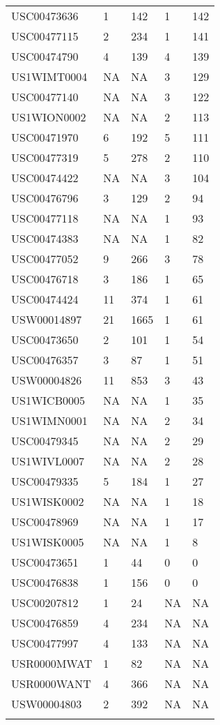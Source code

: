 \begin{longtable}{l l l l l}
				  USC00473636 &   1 & 142 &   1 & 142 \\ 
				  USC00477115 &   2 & 234 &   1 & 141 \\ 
				  USC00474790 &   4 & 139 &   4 & 139 \\ 
				  US1WIMT0004 & NA & NA &   3 & 129 \\ 
				  USC00477140 & NA & NA &   3 & 122 \\ 
				  US1WION0002 & NA & NA &   2 & 113 \\ 
				  USC00471970 &   6 & 192 &   5 & 111 \\ 
				  USC00477319 &   5 & 278 &   2 & 110 \\ 
				  USC00474422 & NA & NA &   3 & 104 \\ 
				  USC00476796 &   3 & 129 &   2 &  94 \\ 
				  USC00477118 & NA & NA &   1 &  93 \\ 
				  USC00474383 & NA & NA &   1 &  82 \\ 
				  USC00477052 &   9 & 266 &   3 &  78 \\ 
				  USC00476718 &   3 & 186 &   1 &  65 \\ 
				  USC00474424 &  11 & 374 &   1 &  61 \\ 
				  USW00014897 &  21 & 1665 &   1 &  61 \\ 
				  USC00473650 &   2 & 101 &   1 &  54 \\ 
				  USC00476357 &   3 &  87 &   1 &  51 \\ 
				  USW00004826 &  11 & 853 &   3 &  43 \\ 
				  US1WICB0005 & NA & NA &   1 &  35 \\ 
				  US1WIMN0001 & NA & NA &   2 &  34 \\ 
				  USC00479345 & NA & NA &   2 &  29 \\ 
				  US1WIVL0007 & NA & NA &   2 &  28 \\ 
				  USC00479335 &   5 & 184 &   1 &  27 \\ 
				  US1WISK0002 & NA & NA &   1 &  18 \\ 
				  USC00478969 & NA & NA &   1 &  17 \\ 
				  US1WISK0005 & NA & NA &   1 &   8 \\ 
				  USC00473651 &   1 &  44 &   0 &   0 \\ 
				  USC00476838 &   1 & 156 &   0 &   0 \\ 
				  USC00207812 &   1 &  24 & NA & NA \\ 
				  USC00476859 &   4 & 234 & NA & NA \\ 
				  USC00477997 &   4 & 133 & NA & NA \\ 
				  USR0000MWAT &   1 &  82 & NA & NA \\ 
				  USR0000WANT &   4 & 366 & NA & NA \\ 
				  USW00004803 &   2 & 392 & NA & NA \\ 
   \label{tab:climate_stations}
		\end{longtable}
